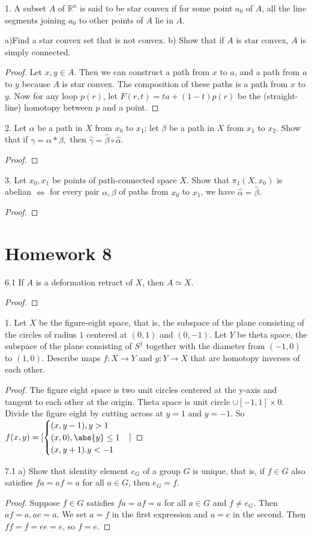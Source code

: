 \documentclass{amsart}
\begin{document}
1. A subset $A$ of $\mathbb{R}^n$ is said to be star convex if for some point $a_0$ of $A$, all the line segments joining $a_0$ to other points of $A$ lie in $A$.

a)Find a star convex set that is not convex. 
b) Show that if $A$ is star convex, $A$ is simply connected.

\begin{proof}
Let $x, y\in A$. Then we can construct a path from $x$ to $a$, and a path from $a$ to $y$ because $A$ is star convex. The composition of these paths is a path from $x$ to $y$. Now for any loop $p(r)$, let $F(r,t)=ta+(1-t)p(r)$ be the (straight-line) homotopy between $p$ and a point.
\end{proof}

2. Let $\alpha$ be a path in $X$ from $x_0$ to $x_1$; let $\beta$ be a path in $X$ from $x_1$ to $x_2$. Show that if $\gamma=\alpha*\beta,$ then $\hat{\gamma}=\hat{\beta}\circ \hat{\alpha}$.
\begin{proof}
\end{proof}

3. Let $x_0, x_1$ be points of path-connected space $X$. Show that $\pi_1(X, x_0)$ is abelian $\iff$ for every pair $\alpha, \beta$ of paths from $x_0$ to $x_1$, we have $\hat{\alpha}=\hat{\beta}$. 
\begin{proof}
\end{proof}

\section{Homework 8}
6.1 If $A$ is a deformation retract of $X$, then $A\simeq X$.
\begin{proof}
\end{proof}
1. Let $X$ be the figure-eight space, that is, the subspace of the plane consisting of the circles of radius $1$ centered at $(0,1)$ and $(0,-1)$. Let $Y$ be theta space, the subspace of the plane consisting of $S^1$ together with the diameter from $(-1,0)$ to $(1,0)$. Describe maps $f:X\to Y$ and $g:Y\to X$ that are homotopy inverses of each other.

\begin{proof}
The figure eight space is two unit circles centered at the y-axis and tangent to each other at the origin. Theta space is unit circle $\cup [-1,1] \times 0$. Divide the figure eight by cutting across at $y=1$ and $y=-1$. So $f(x,y)= [ \begin{cases}  (x,y-1),y>1 \\(x,0), \abs{y}\le 1 \\(x,y+1). y< -1
   \end{cases}
]$
\end{proof}
7.1 a) Show that identity element $e_G$ of a group $G$ is unique, that is, if $f\in G$ also satisfies $fa=af=a$ for all $a\in G$, then $e_G=f$.
\begin{proof}
Suppose $f\in G$ satisfies $fa=af=a$ for all $a\in G$ and $f\neq e_G$. Then $af=a,ae=a$. We set $a=f$ in the first expression and $a=e$ in the second. Then  $ff=f=ee=e$, so $f=e$. 
\end{proof}
\end{document}
